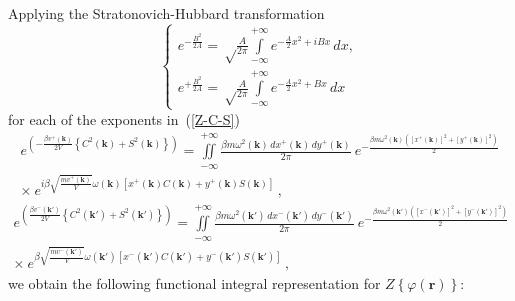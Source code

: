 \documentclass[aps,pre,preprint,floatfix,twoside,tightenlines,showpacs,
showkeys]{revtex4}
\begin{document}
Applying the Stratonovich-Hubbard transformation
\begin{equation}\label{SH}
\left\{
\begin{array}{c}
    {\displaystyle e^{-\frac{B^2}{2A}}=\sqrt\frac{A}{2\pi} \int\limits_{-\infty}^{+\infty}e^{-\frac{A}{2}x^{2}+iBx}\,dx,}\\
{\displaystyle e^{+\frac{B^2}{2A}}=\sqrt\frac{A}{2\pi} \int\limits_{-\infty}^{+\infty}e^{-\frac{A}{2}x^{2}+Bx}\,dx}
\end{array}
\right.
\end{equation}
for each of the exponents in~(\ref{Z-C-S})
%
\begin{equation}\label{e1}
\begin{array}{r}
{\displaystyle e^{ \left( -\frac{\beta v^+(\mathbf{k})}{2V} \left\{ C^2(\mathbf{k}) + S^2(\mathbf{k}) \right\} \right)} = \iint\limits_{-\infty}^{+\infty} \frac{\beta m \omega^{2} (\mathbf{k})\, dx^{+}(\mathbf{k})\, dy^{+} (\mathbf{k})}{2\pi}\ e^{ -\frac{\beta m \omega^{2}(\mathbf{k})\left(\left[x^{+} \left(\mathbf{k}\right)\right]^{2} + \left[y^{+}\left(\mathbf{k}\right)\right]^{2}\right)}{2}} }\\
\times\ {\displaystyle e^{i\beta \sqrt{\frac{m v^+(\mathbf{k})}{V}} \omega(\mathbf{k})  \left[ x^+(\mathbf{k}) C(\mathbf{k}) + y^+(\mathbf{k}) S(\mathbf{k}) \right] }\, ,  }
\end{array}
\end{equation}
%
\begin{equation}\label{e2}
\begin{array}{r}
{\displaystyle e^{ \left( \frac{\beta v^-(\mathbf{k}')}{2V} \left\{ C^2(\mathbf{k}') + S^2(\mathbf{k}') \right\} \right)} = \iint\limits_{-\infty}^{+\infty} \frac{\beta m \omega^{2} (\mathbf{k}')\, dx^{-}(\mathbf{k}')\, dy^{-} (\mathbf{k}')}{2\pi}\ e^{ -\frac{\beta m \omega^{2}(\mathbf{k}')\left(\left[x^{-}(\mathbf{k}')\right]^{2} + \left[y^{-}(\mathbf{k}')\right]^{2}\right)}{2}} }\\
\times\ {\displaystyle e^{\beta \sqrt{\frac{m v^-(\mathbf{k}')}{V}} \omega(\mathbf{k}')  \left[ x^-(\mathbf{k}') C(\mathbf{k}') + y^-(\mathbf{k}') S(\mathbf{k}') \right] }\, ,  }
\end{array}
\end{equation}
we obtain the following functional integral representation for $Z{\left\{  \varphi(\mathbf{r})\right\}}$:
%
\end{document}
